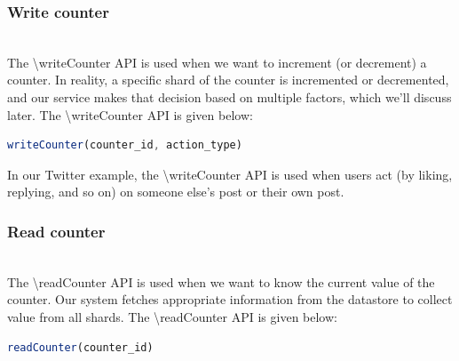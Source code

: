 \subsubsection{Write counter}\label{rjM9sXsz0k41SzVMSAHN_}
\\
The \textbackslash{writeCounter} API is used when we want to increment (or decrement) a counter. In reality, a specific shard of the counter is incremented or decremented, and our service makes that decision based on multiple factors, which we'll discuss later. The
\textbackslash{writeCounter} API is given below:

\begin{lstlisting}[language=JavaScript]
writeCounter(counter_id, action_type)
\end{lstlisting}

\begin{table}[htbp]
\centering
\small
{}
\end{table}

In our Twitter example, the \textbackslash{writeCounter} API is used when users act (by liking, replying, and so on) on someone else's post or their own post.

\subsubsection{Read counter}\label{85Wx1-Eyn1KxXuHFzJx7M}
\\
The \textbackslash{readCounter} API is used when we want to know the current value of the counter. Our system fetches appropriate information from the datastore to collect value from all shards. The
\textbackslash{readCounter} API is given below:

\begin{lstlisting}[language=JavaScript]
readCounter(counter_id)
\end{lstlisting}

